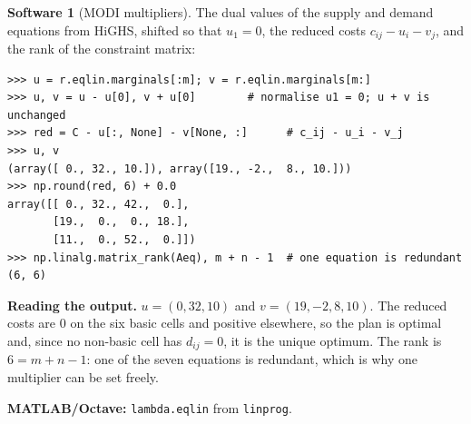 \documentclass[11pt,a4paper]{article}
\numberwithin{equation}{section}
\theoremstyle{definition}
\newtheorem{software}[thm]{Software}
\begin{document}
\begin{software}[MODI multipliers]
\label{sw:modi}
The dual values of the supply and demand equations from HiGHS, shifted so that $u_1 = 0$, the reduced costs $c_{ij} - u_i - v_j$, and the rank of the constraint matrix:
{\small\begin{verbatim}
>>> u = r.eqlin.marginals[:m]; v = r.eqlin.marginals[m:]
>>> u, v = u - u[0], v + u[0]        # normalise u1 = 0; u + v is unchanged
>>> red = C - u[:, None] - v[None, :]      # c_ij - u_i - v_j
>>> u, v
(array([ 0., 32., 10.]), array([19., -2.,  8., 10.]))
>>> np.round(red, 6) + 0.0
array([[ 0., 32., 42.,  0.],
       [19.,  0.,  0., 18.],
       [11.,  0., 52.,  0.]])
>>> np.linalg.matrix_rank(Aeq), m + n - 1  # one equation is redundant
(6, 6)
\end{verbatim}}
\textbf{Reading the output.} $u = (0, 32, 10)$ and $v = (19, -2, 8, 10)$. The reduced costs are $0$ on the six basic cells and positive elsewhere, so the plan is optimal and, since no non-basic cell has $d_{ij} = 0$, it is the unique optimum. The rank is $6 = m + n - 1$: one of the seven equations is redundant, which is why one
multiplier can be set freely.

\textbf{MATLAB/Octave:} \texttt{lambda.eqlin} from \texttt{linprog}.
\end{software}
\end{document}

